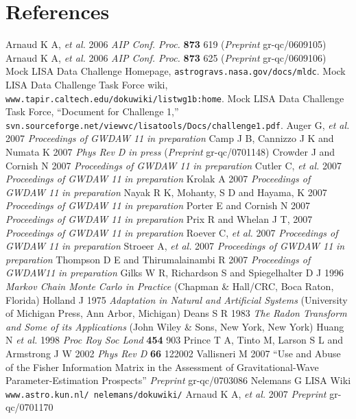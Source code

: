 \documentclass[12pt]{iopart}
\begin{document}
\section*{References}
\begin{thebibliography}{10}
 Arnaud K A, {\it et al.} 2006 {\it AIP Conf. Proc.} {\bf 873} 619 ({\it Preprint} gr-qc/0609105)
 Arnaud K A, {\it et al.} 2006 {\it AIP Conf. Proc.} {\bf 873} 625 ({\it Preprint} gr-qc/0609106)
 Mock LISA Data Challenge Homepage, {\tt astrogravs.nasa.gov/docs/mldc}.
 Mock LISA Data Challenge Task Force wiki, {\tt www.tapir.caltech.edu/dokuwiki/listwg1b:home}.
 Mock LISA Data Challenge Task Force, ``Document for Challenge 1,'' {\tt svn.sourceforge.net/viewvc/lisatools/Docs/challenge1.pdf}.
 Auger G, {\it et al.} 2007 {\it Proceedings of GWDAW 11} {\it in preparation}
 Camp J B, Cannizzo J K and Numata K 2007 {\it Phys Rev D} {\it in press} ({\it Preprint} gr-qc/0701148)
 Crowder J and Cornish N 2007 {\it Proceedings of GWDAW 11} {\it in preparation}
 Cutler C, {\it et al.} 2007 {\it Proceedings of GWDAW 11} {\it in preparation}
 Krolak A 2007 {\it Proceedings of GWDAW 11} {\it in preparation}
 Nayak R K, Mohanty, S D and Hayama, K 2007 {\it Proceedings of GWDAW 11} {\it in preparation}
 Porter E and Cornish N 2007 {\it Proceedings of GWDAW 11} {\it in preparation}
 Prix R and Whelan J T, 2007 {\it Proceedings of GWDAW 11} {\it in preparation}
 Roever C, {\it et al.} 2007 {\it Proceedings of GWDAW 11} {\it in preparation}
 Stroeer A, {\it et al.} 2007 {\it Proceedings of GWDAW 11} {\it in preparation}
 Thompson D E and Thirumalainambi R 2007 {\it Proceedings of GWDAW11} {\it in preparation}
 Gilks W R, Richardson S and Spiegelhalter D J 1996 {\it Markov Chain Monte Carlo in Practice} (Chapman \& Hall/CRC, Boca Raton, Florida)
 Holland J 1975 {\it Adaptation in Natural and Artificial Systems} (University of Michigan Press, Ann Arbor, Michigan)
 Deans S R 1983 {\it The Radon Transform and Some of its Applications} (John Wiley \& Sons, New York, New York)
 Huang N {\it et al.} 1998 {\it Proc Roy Soc Lond} {\bf 454} 903
 Prince T A, Tinto M, Larson S L and Armstrong J W 2002 {\it Phys Rev D} {\bf 66} 122002
 Vallisneri M 2007 ``Use and Abuse of the Fisher Information Matrix in the Assessment of Gravitational-Wave Parameter-Estimation Prospects'' {\it Preprint} gr-qc/0703086
 Nelemans G LISA Wiki {\tt www.astro.kun.nl/~nelemans/dokuwiki/}
 Arnaud K A, {\it et al.} 2007 {\it Preprint} gr-qc/0701170

\end{thebibliography}
\end{document}
